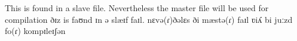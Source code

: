 This is found in a slave file. Nevertheless the master file will be used for compilation
ðɪz is faʊnd ɪn ə slæɪf faɪl. nɛvə(ɾ)ðəlɛs ði mæstə(ɾ) faɪl ʋiʎ bi juːzd fo(ɾ) kompɪleɪʃən
\cite{van_sluis_development_2014}

